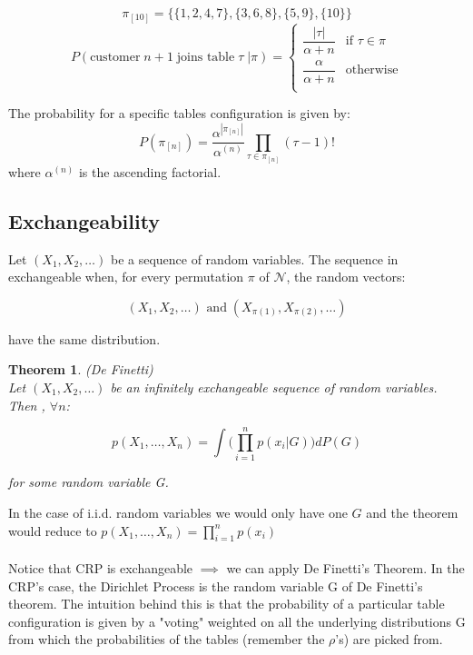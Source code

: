 \documentclass[twoside]{article}
\newcounter{lecnum}
\newtheorem{theorem}{Theorem}[lecnum]
\begin{document}
$$\pi_{[10]} = \{\{1,2,4,7\}, \{3,6,8\},\{5,9\},\{10\}\}$$
\[
  P(\text{customer} \; n+1 \; \text{joins table} \; \tau \; | \pi)=
  \begin{cases}
                                  \dfrac{ |\tau|}{\alpha+n} & \text{if $\tau \in \pi$} \\
                                   \dfrac{\alpha}{\alpha +n} & \text{otherwise} \\
  \end{cases}
\]

The probability for a specific tables configuration is given by:
$$P(\pi_{[n]}) =\dfrac{ \alpha^{|\pi_{[n]}|}}{\alpha^{(n)}} \prod_{\tau \in \pi_{[n]}} (\tau -1)! $$ 
where $\alpha^{(n)}$ is the ascending factorial.

\subsection{Exchangeability}

Let $(X_{1},X_{2},\ldots)$ be a sequence of random variables. The sequence in exchangeable when, for every permutation $\pi$ of $\mathcal{N}$, the random vectors:

$$(X_{1},X_{2},\ldots) \text{ and} \; (X_{\pi(1)}, X_{\pi(2)}, \ldots)$$

have the same distribution.

\begin{theorem}(De Finetti)\\
Let $(X_{1},X_{2},\ldots)$ be an infinitely exchangeable sequence of random variables. Then , $\forall n$:

$$p(X_{1},\ldots,X_{n}) = \int \Big( \prod_{i=1}^{n} p(x_{i}|G)\Big)dP(G)$$

for some random variable G.

\end{theorem}

In the case of i.i.d. random variables we would only have  one $G$ and the theorem would reduce to $p(X_{1},\ldots,X_{n}) =  \prod_{i=1}^{n} p(x_{i})$
\\ \\
Notice that CRP is exchangeable $\implies $ we can apply De Finetti's Theorem. In the CRP's case, the Dirichlet Process is the random variable G of De Finetti's theorem. The intuition behind this is that the probability of a particular table configuration is given by a "voting"  weighted on all the underlying distributions G from which the probabilities of the tables (remember the $\rho$'s) are picked from.
\end{document}
